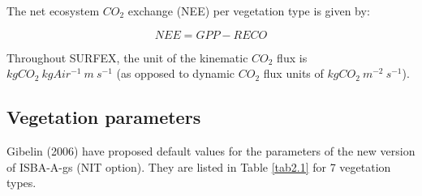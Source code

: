 {The net ecosystem $CO_{2}$ exchange (NEE) per vegetation type is given by:

\begin{equation}
NEE=GPP - RECO
\end{equation}

Throughout SURFEX, the unit of the kinematic $CO_{2}$ flux is $kgCO_{2} ~kgAir^{-1} ~m ~s^{-1}$ (as opposed to
dynamic $CO_{2}$ flux units of $kgCO_{2} ~m^{-2} ~s^{-1}$).


\subsection{Vegetation parameters}

Gibelin \etal (2006) have proposed default values for the parameters of the new version of ISBA-A-gs
(NIT option). They are listed in Table \ref{tab2.1} for 7 vegetation types.

\begin{table}
\caption{ Values of ISBA-A-gs parameters for the ECOCLIMAP vegetation types ($g_{m}^{*}$ in $ mm ~s^{-1},~ $ 
$\tau_{M}$ in days, $LAI_{min}$ in $m^{2} ~ m^{-2}$,
$D_{max}^{*}$ in $g ~kg^{-1}$, $f_{0}^{*}$ dimensionless, 
$g_{c}$ in $ mm ~s^{-1}$, strategy of response to soil moisture stress (drought-tolerant or drought-avoiding), 
$\theta_{C}$ dimensionless, $e$ in $m^{2} ~kg^{-1} ~\%^{-1}$, $f$ in $m^{2} ~kg^{-1}$, and $N_{l}$ in \%
}


\end{table}}
